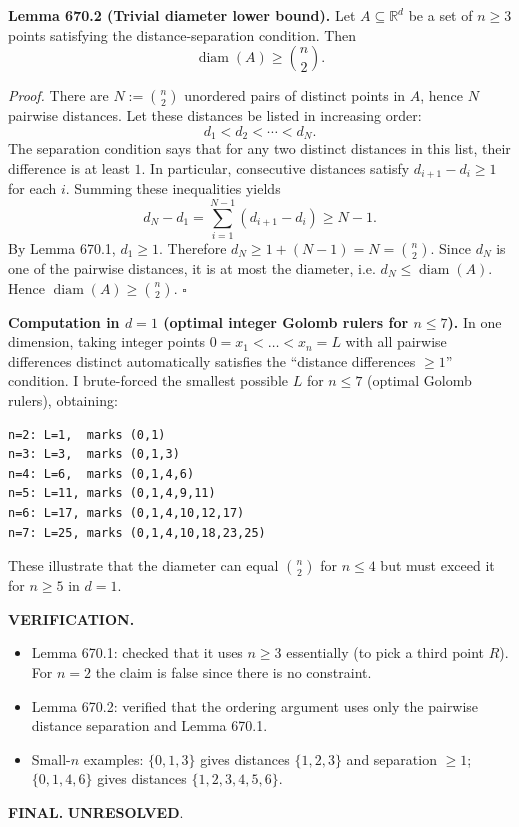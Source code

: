 \medskip
\noindent\textbf{Lemma 670.2 (Trivial diameter lower bound).}
Let $A\subseteq\mathbb{R}^d$ be a set of $n\ge 3$ points satisfying the distance-separation condition.
Then
\[
\operatorname{diam}(A)\ge \binom{n}{2}.
\]

\noindent\emph{Proof.}
There are $N:=\binom{n}{2}$ unordered pairs of distinct points in $A$, hence $N$ pairwise distances.
Let these distances be listed in increasing order:
\[d_1<d_2<\cdots<d_N.
\]
The separation condition says that for any two distinct distances in this list, their difference is at least $1$.
In particular, consecutive distances satisfy $d_{i+1}-d_i\ge 1$ for each $i$.
Summing these inequalities yields
\[
 d_N - d_1 = \sum_{i=1}^{N-1} (d_{i+1}-d_i) \ge N-1.
\]
By Lemma 670.1, $d_1\ge 1$.
Therefore $d_N\ge 1+(N-1)=N=\binom n2$.
Since $d_N$ is one of the pairwise distances, it is at most the diameter, i.e. $d_N\le \operatorname{diam}(A)$.
Hence $\operatorname{diam}(A)\ge \binom n2$.
\hfill$\square$

\medskip
\noindent\textbf{Computation in $d=1$ (optimal integer Golomb rulers for $n\le 7$).}
In one dimension, taking integer points $0=x_1<\dots<x_n=L$ with all pairwise differences distinct automatically satisfies the ``distance differences $\ge 1$'' condition.
I brute-forced the smallest possible $L$ for $n\le 7$ (optimal Golomb rulers), obtaining:
\begin{verbatim}
n=2: L=1,  marks (0,1)
n=3: L=3,  marks (0,1,3)
n=4: L=6,  marks (0,1,4,6)
n=5: L=11, marks (0,1,4,9,11)
n=6: L=17, marks (0,1,4,10,12,17)
n=7: L=25, marks (0,1,4,10,18,23,25)
\end{verbatim}
These illustrate that the diameter can equal $\binom n2$ for $n\le 4$ but must exceed it for $n\ge 5$ in $d=1$.

\bigskip
\noindent\textbf{VERIFICATION.}
\begin{itemize}
\item Lemma 670.1: checked that it uses $n\ge 3$ essentially (to pick a third point $R$). For $n=2$ the claim is false since there is no constraint.
\item Lemma 670.2: verified that the ordering argument uses only the pairwise distance separation and Lemma 670.1.
\item Small-$n$ examples: $\{0,1,3\}$ gives distances $\{1,2,3\}$ and separation $\ge 1$; $\{0,1,4,6\}$ gives distances $\{1,2,3,4,5,6\}$.
\end{itemize}

\bigskip
\noindent\textbf{FINAL.} \textbf{UNRESOLVED}.

